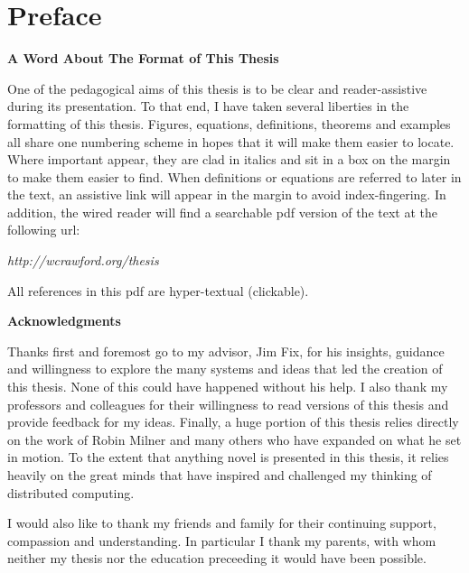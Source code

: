 \chapter*{Preface}
\vspace{5cm}
\begin{center}\textsf{\textbf{A Word About The Format of This Thesis}}\end{center}
One of the pedagogical aims of this thesis is to be clear and reader-assistive during its presentation.  To that end, I have taken several liberties in the formatting of this thesis.  Figures, equations, definitions, theorems and examples all share one numbering scheme in hopes that it will make them easier to locate. Where important  appear, they are clad in italics and sit in a box on the margin to make them easier to find.  When definitions or equations are referred to later in the text, an assistive link will appear in the margin to avoid index-fingering.  In addition, the wired reader will find a searchable pdf version of the text at the following url:
\begin{center}
	\emph{http://wcrawford.org/thesis}
\end{center}
All references in this pdf are hyper-textual (clickable).\\


\begin{center}\textsf{\textbf{Acknowledgments}}\end{center}
Thanks first and foremost go to my advisor, Jim Fix, for his insights, guidance and willingness to explore the many systems and ideas that led the creation of this thesis.  None of this could have happened without his help.  I also thank my professors and colleagues for their willingness to read versions of this thesis and provide feedback for my ideas.  Finally, a huge portion of this thesis relies directly on the work of Robin Milner and many others who have expanded on what he set in motion.  To the extent that anything novel is presented in this thesis, it relies heavily on the great minds that have inspired and challenged my thinking of distributed computing.

I would also like to thank my friends and family for their continuing support, compassion and understanding.  In particular I thank my parents, with whom neither my thesis nor the education preceeding it would have been possible.